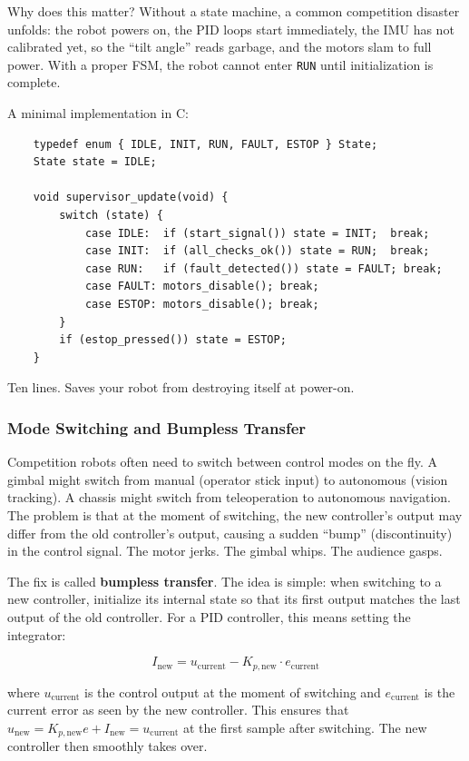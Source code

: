 Why does this matter? Without a state machine, a common competition disaster unfolds: the robot powers on, the PID loops start immediately, the IMU has not calibrated yet, so the ``tilt angle'' reads garbage, and the motors slam to full power. With a proper FSM, the robot cannot enter \texttt{RUN} until initialization is complete.

A minimal implementation in C:

\begin{verbatim}
    typedef enum { IDLE, INIT, RUN, FAULT, ESTOP } State;
    State state = IDLE;

    void supervisor_update(void) {
        switch (state) {
            case IDLE:  if (start_signal()) state = INIT;  break;
            case INIT:  if (all_checks_ok()) state = RUN;  break;
            case RUN:   if (fault_detected()) state = FAULT; break;
            case FAULT: motors_disable(); break;
            case ESTOP: motors_disable(); break;
        }
        if (estop_pressed()) state = ESTOP;
    }
\end{verbatim}

Ten lines. Saves your robot from destroying itself at power-on.

\subsubsection{Mode Switching and Bumpless Transfer}

Competition robots often need to switch between control modes on the fly. A gimbal might switch from manual (operator stick input) to autonomous (vision tracking). A chassis might switch from teleoperation to autonomous navigation. The problem is that at the moment of switching, the new controller's output may differ from the old controller's output, causing a sudden ``bump'' (discontinuity) in the control signal. The motor jerks. The gimbal whips. The audience gasps.

The fix is called \textbf{bumpless transfer}. The idea is simple: when switching to a new controller, initialize its internal state so that its first output matches the last output of the old controller. For a PID controller, this means setting the integrator:

\begin{equation}
I_{\text{new}} = u_{\text{current}} - K_{p,\text{new}} \cdot e_{\text{current}}
\end{equation}

where $u_{\text{current}}$ is the control output at the moment of switching and $e_{\text{current}}$ is the current error as seen by the new controller. This ensures that $u_{\text{new}} = K_{p,\text{new}} e + I_{\text{new}} = u_{\text{current}}$ at the first sample after switching. The new controller then smoothly takes over.

